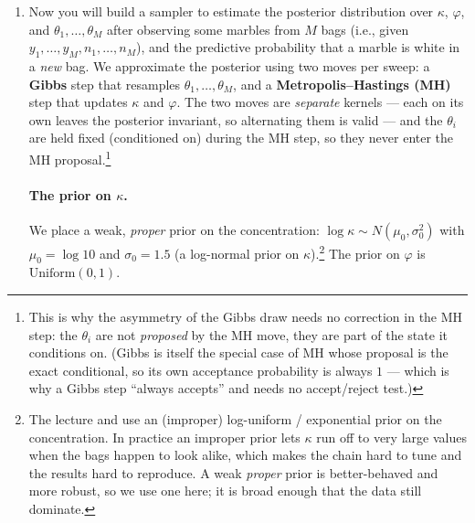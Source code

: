 \documentclass[11pt]{article}
\begin{document}
\begin{enumerate}
\begin{enumerate}
\item Now you will build a sampler to estimate the posterior distribution over $\kappa$, $\varphi$, and $\theta_1,\dotsc,\theta_M$ after observing some marbles from $M$ bags (i.e., given $y_1,\dotsc,y_M, n_1,\dotsc,n_M$), and the predictive probability that a marble is white in a {\em new} bag. We approximate the posterior using two moves per sweep: a {\bf Gibbs} step that resamples $\theta_1,\dotsc,\theta_M$, and a {\bf Metropolis--Hastings (MH)} step that updates $\kappa$ and $\varphi$. The two moves are {\em separate} kernels --- each on its own leaves the posterior invariant, so alternating them is valid --- and the $\theta_i$ are held fixed (conditioned on) during the MH step, so they never enter the MH proposal.\footnote{This is why the asymmetry of the Gibbs draw needs no correction in the MH step: the $\theta_i$ are not {\em proposed} by the MH move, they are part of the state it conditions on. (Gibbs is itself the special case of MH whose proposal is the exact conditional, so its own acceptance probability is always $1$ --- which is why a Gibbs step ``always accepts'' and needs no accept/reject test.)}

\paragraph{The prior on $\kappa$.} We place a weak, {\em proper} prior on the concentration: $\log \kappa \sim N(\mu_0, \sigma_0^2)$ with $\mu_0 = \log 10$ and $\sigma_0 = 1.5$ (a log-normal prior on $\kappa$).\footnote{The lecture and \citet*{kemp07} use an (improper) log-uniform / exponential prior on the concentration. In practice an improper prior lets $\kappa$ run off to very large values when the bags happen to look alike, which makes the chain hard to tune and the results hard to reproduce. A weak {\em proper} prior is better-behaved and more robust, so we use one here; it is broad enough that the data still dominate.} The prior on $\varphi$ is $\mathrm{Uniform}(0,1)$.


\end{enumerate}
\end{enumerate}
\end{document}
